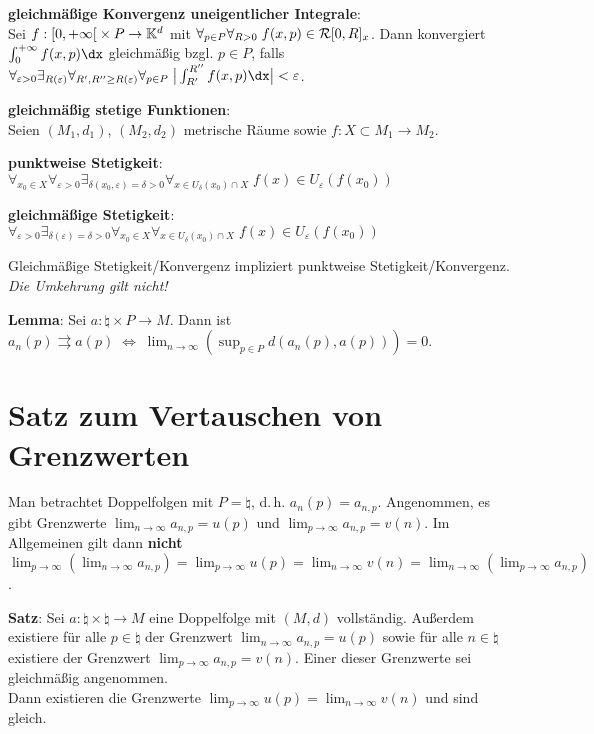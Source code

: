 \textbf{gleichmäßige Konvergenz uneigentlicher Integrale}: \\
Sei $f: \left[0, +\infty\right[ \times P \rightarrow \mathbb{K}^d$ mit
$\forall_{p \in P} \forall_{R > 0}\; f(x, p) \in \mathcal{R}[0,R]_x$.
Dann konvergiert $\int_0^{+\infty} f(x, p)\dx$ gleichmäßig bzgl. $p \in P$,
falls $\forall_{\varepsilon > 0} \exists_{R(\varepsilon)}
\forall_{R', R'' \ge R(\varepsilon)} \forall_{p \in P}\;
\big|\int_{R'}^{R''} f(x, p)\dx\big| < \varepsilon$.

\linie

\textbf{gleichmäßig stetige Funktionen}: \\
Seien $(M_1, d_1)$, $(M_2, d_2)$ metrische Räume sowie
$f: X \subset M_1 \rightarrow M_2$.

\textbf{punktweise Stetigkeit}:
$\forall_{x_0 \in X} \forall_{\varepsilon > 0}
\exists_{\delta(x_0, \varepsilon) = \delta > 0}
\forall_{x \in U_\delta(x_0) \cap X}\; f(x) \in U_\varepsilon(f(x_0))$

\textbf{gleichmäßige Stetigkeit}:
$\forall_{\varepsilon > 0}
\exists_{\delta(\varepsilon) = \delta > 0} \forall_{x_0 \in X}
\forall_{x \in U_\delta(x_0) \cap X}\; f(x) \in U_\varepsilon(f(x_0))$

Gleichmäßige Stetigkeit/Konvergenz impliziert punktweise
Stetigkeit/Konvergenz. \\
\emph{Die Umkehrung gilt nicht!}

\linie

\textbf{Lemma}: Sei $a: \natural \times P \rightarrow M$.
Dann ist $a_n(p) \rightrightarrows a(p) \;\Leftrightarrow\;
\lim_{n \to \infty} \left(\sup_{p \in P} d(a_n(p), a(p))\right) = 0$.

\section{%
    Satz zum Vertauschen von Grenzwerten%
}

Man betrachtet Doppelfolgen mit $P = \natural$, d.\,h. $a_n(p) = a_{n,p}$.
Angenommen, es gibt Grenzwerte $\lim_{n \to \infty} a_{n,p} = u(p)$
und $\lim_{p \to \infty} a_{n,p} = v(n)$.
Im Allgemeinen gilt dann \textbf{nicht} \\
$\lim_{p \to \infty} (\lim_{n \to \infty} a_{n,p}) =
\lim_{p \to \infty} u(p) = \lim_{n \to \infty} v(n) =
\lim_{n \to \infty} (\lim_{p \to \infty} a_{n,p})$.

\textbf{Satz}:
Sei $a: \natural \times \natural \rightarrow M$ eine Doppelfolge
mit $(M,d)$ vollständig.
Außerdem existiere für alle $p \in \natural$ der Grenzwert
$\lim_{n \to \infty} a_{n,p} = u(p)$ sowie
für alle $n \in \natural$ existiere der Grenzwert
$\lim_{p \to \infty} a_{n,p} = v(n)$.
Einer dieser Grenzwerte sei gleichmäßig angenommen. \\
Dann existieren die Grenzwerte
$\lim_{p \to \infty} u(p) = \lim_{n \to \infty} v(n)$
und sind gleich.

